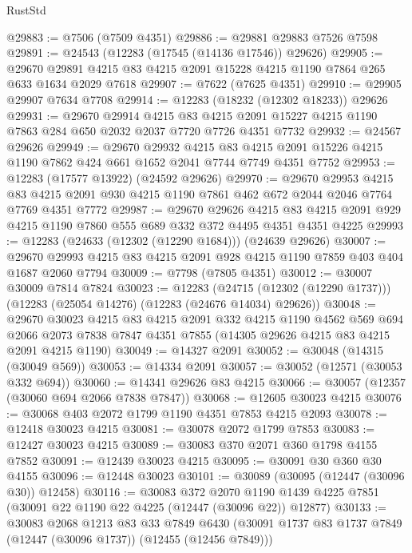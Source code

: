 \begin{lexlean}{RustStd}
\begin{coremodule}
@29883 := @7506 (@7509 @4351)
@29886 := @29881 @29883 @7526 @7598
@29891 := @24543 (@12283 (@17545 (@14136 @17546)) @29626)
@29905 := @29670 @29891 @4215 @83 @4215 @2091 @15228 @4215 @1190 @7864 @265 @633 @1634 @2029 @7618
@29907 := @7622 (@7625 @4351)
@29910 := @29905 @29907 @7634 @7708
@29914 := @12283 (@18232 (@12302 @18233)) @29626
@29931 := @29670
    @29914
    @4215
    @83
    @4215
    @2091
    @15227
    @4215
    @1190
    @7863
    @284
    @650
    @2032
    @2037
    @7720
    @7726
    @4351
    @7732
@29932 := @24567 @29626
@29949 := @29670
    @29932
    @4215
    @83
    @4215
    @2091
    @15226
    @4215
    @1190
    @7862
    @424
    @661
    @1652
    @2041
    @7744
    @7749
    @4351
    @7752
@29953 := @12283 (@17577 @13922) (@24592 @29626)
@29970 := @29670
    @29953
    @4215
    @83
    @4215
    @2091
    @930
    @4215
    @1190
    @7861
    @462
    @672
    @2044
    @2046
    @7764
    @7769
    @4351
    @7772
@29987 := @29670
    @29626
    @4215
    @83
    @4215
    @2091
    @929
    @4215
    @1190
    @7860
    @555
    @689
    @332
    @372
    @4495
    @4351
    @4351
    @4225
@29993 := @12283 (@24633 (@12302 (@12290 @1684))) (@24639 @29626)
@30007 := @29670 @29993 @4215 @83 @4215 @2091 @928 @4215 @1190 @7859 @403 @404 @1687 @2060 @7794
@30009 := @7798 (@7805 @4351)
@30012 := @30007 @30009 @7814 @7824
@30023 := @12283
    (@24715 (@12302 (@12290 @1737)))
    (@12283 (@25054 @14276) (@12283 (@24676 @14034) @29626))
@30048 := @29670
    @30023
    @4215
    @83
    @4215
    @2091
    @332
    @4215
    @1190
    @4562
    @569
    @694
    @2066
    @2073
    @7838
    @7847
    @4351
    @7855
    (@14305 @29626 @4215 @83 @4215 @2091 @4215 @1190)
@30049 := @14327 @2091
@30052 := @30048 (@14315 (@30049 @569))
@30053 := @14334 @2091
@30057 := @30052 (@12571 (@30053 @332 @694))
@30060 := @14341 @29626 @83 @4215
@30066 := @30057 (@12357 (@30060 @694 @2066 @7838 @7847))
@30068 := @12605 @30023 @4215
@30076 := @30068 @403 @2072 @1799 @1190 @4351 @7853 @4215 @2093
@30078 := @12418 @30023 @4215
@30081 := @30078 @2072 @1799 @7853
@30083 := @12427 @30023 @4215
@30089 := @30083 @370 @2071 @360 @1798 @4155 @7852
@30091 := @12439 @30023 @4215
@30095 := @30091 @30 @360 @30 @4155
@30096 := @12448 @30023
@30101 := @30089 (@30095 (@12447 (@30096 @30)) @12458)
@30116 := @30083
    @372
    @2070
    @1190
    @1439
    @4225
    @7851
    (@30091 @22 @1190 @22 @4225 (@12447 (@30096 @22)) @12877)
@30133 := @30083
    @2068
    @1213
    @83
    @33
    @7849
    @6430
    (@30091 @1737 @83 @1737 @7849 (@12447 (@30096 @1737)) (@12455 (@12456 @7849)))

\end{coremodule}
\end{lexlean}
